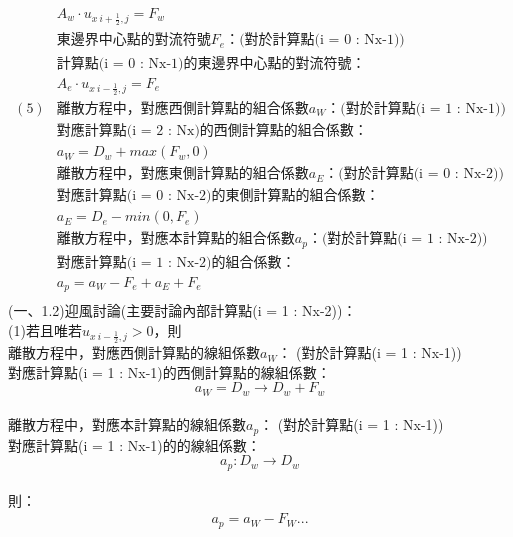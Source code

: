 \documentclass[12pt]{article}
\begin{document}
\begin{equation}
\begin{split}
        &A_{w}\cdot u_{x\ i+\frac{1}{2},j} = F_{w}\\
        &\mbox{東邊界中心點的對流符號$F_{e}$：(對於計算點(i = 0 : Nx-1))}\\
        &\mbox{計算點(i = 0 : Nx-1)的東邊界中心點的對流符號：}\\
        &A_{e}\cdot u_{x\ i-\frac{1}{2},j} = F_{e}\\
        (5)&\mbox{離散方程中，對應西側計算點的組合係數$a_{W}$：(對於計算點(i = 1 : Nx-1))}\\    
        &\mbox{對應計算點(i = 2 : Nx)的西側計算點的組合係數：}\\
        &a_{W} = D_{w} + max(F_{w},0)\\
        &\mbox{離散方程中，對應東側計算點的組合係數$a_{E}$：(對於計算點(i = 0 : Nx-2))}\\
        &\mbox{對應計算點(i = 0 : Nx-2)的東側計算點的組合係數：}\\
        &a_{E} = D_{e} - min(0,F_{e}) \\
        &\mbox{離散方程中，對應本計算點的組合係數$a_{p}$：(對於計算點(i = 1 : Nx-2))}\\    
        &\mbox{對應計算點(i = 1 : Nx-2)的組合係數：}\\
        &a_{p} = a_{W}-F_{e} + a_{E} + F_{e} \\
    \end{split}
\end{equation}
\newpage
\noindent (一、1.2)迎風討論(主要討論內部計算點(i = 1 : Nx-2))：\\

\noindent (1)若且唯若$u_{x\ i-\frac{1}{2} , j} > 0$，則\\
    離散方程中，對應西側計算點的線組係數$a_{W}$：
    (對於計算點(i = 1 : Nx-1))\\
    對應計算點(i = 1 : Nx-1)的西側計算點的線組係數：\\
    $$a_{W} = D_{w} \rightarrow D_{w} + F_{w}$$\\
    離散方程中，對應本計算點的線組係數$a_{p}$：
    (對於計算點(i = 1 : Nx-1))\\
    對應計算點(i = 1 : Nx-1)的的線組係數：\\
    $$a_{p} : D_{w} \rightarrow D_{w}$$\\
\noindent 則：\\
\begin{equation}
    \begin{split}
    a_{p} = a_{W} - F_{W} ...
\end{split}
\end{equation}
\end{document}
